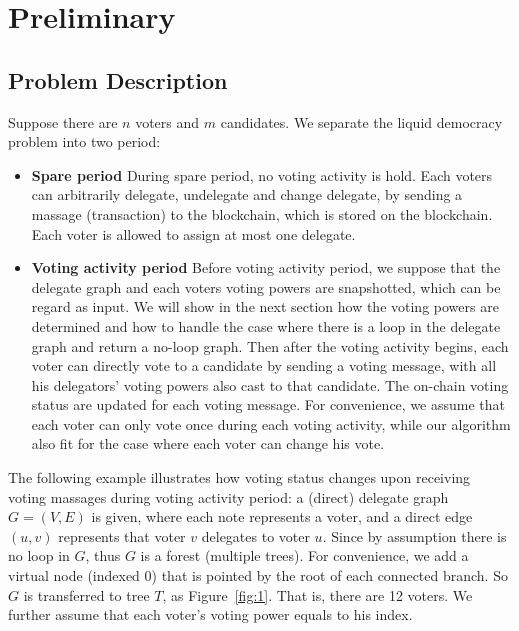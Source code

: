 \section{Preliminary}
\subsection{Problem Description}
Suppose there are $n$ voters and $m$ candidates. We separate the liquid democracy  problem into two period:
\begin{itemize}
	\item \textbf{Spare period} During spare period, no voting activity is hold. Each voters can arbitrarily delegate, undelegate and change delegate, by sending a massage (transaction) to the blockchain, which is stored on the blockchain. Each voter is allowed to assign at most one delegate. 
	\item \textbf{Voting activity period} Before voting activity period, we suppose that the delegate graph and each voters voting powers are snapshotted, which can be regard as input. We will show in the next section how the voting powers are determined and how to handle the case where there is a loop in the delegate graph and return a no-loop graph. Then after the voting activity begins, each voter can directly vote to a candidate by sending a voting message, with all his delegators' voting powers also cast to that candidate. The on-chain voting status are updated for each voting message. For convenience, we assume that each voter can only vote once during each voting activity, while our algorithm also fit for the case where each voter can change his vote.  
\end{itemize}
The following example illustrates how voting status changes upon receiving voting massages during voting activity period: 
 a (direct) delegate graph $G=(V,E)$ is given, where each note represents a voter, and a direct edge $(u,v)$ represents that voter $v$ delegates to voter $u$. Since by assumption there is no
loop in $G$, thus $G$ is a forest (multiple trees). For convenience, we add a virtual node (indexed 0) that
is pointed by the root of each connected branch. So $G$ is transferred to tree $T$, as
Figure~\ref{fig:1}. That is, there are 12 voters. We further assume that each voter's voting power equals to his index. 

